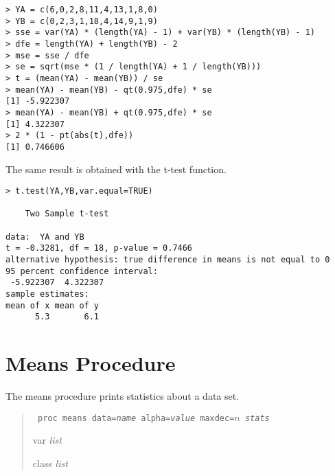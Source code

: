 \documentclass[11pt]{article}
\begin{document}
\begin{Verbatim}
> YA = c(6,0,2,8,11,4,13,1,8,0)
> YB = c(0,2,3,1,18,4,14,9,1,9)
> sse = var(YA) * (length(YA) - 1) + var(YB) * (length(YB) - 1)
> dfe = length(YA) + length(YB) - 2
> mse = sse / dfe
> se = sqrt(mse * (1 / length(YA) + 1 / length(YB)))
> t = (mean(YA) - mean(YB)) / se
> mean(YA) - mean(YB) - qt(0.975,dfe) * se
[1] -5.922307
> mean(YA) - mean(YB) + qt(0.975,dfe) * se
[1] 4.322307
> 2 * (1 - pt(abs(t),dfe))
[1] 0.746606
\end{Verbatim}

The same result is obtained with the t-test function.

\begin{Verbatim}
> t.test(YA,YB,var.equal=TRUE)

	Two Sample t-test

data:  YA and YB
t = -0.3281, df = 18, p-value = 0.7466
alternative hypothesis: true difference in means is not equal to 0
95 percent confidence interval:
 -5.922307  4.322307
sample estimates:
mean of x mean of y 
      5.3       6.1 
\end{Verbatim}

\newpage

\section{Means Procedure}
The means procedure prints statistics about a data set.

\begin{quote}
{\tt
proc means data={\it name} alpha={\it value} maxdec=$n$ {\it stats}

var {\it list}

class {\it list}
}
\end{quote}
\end{document}
